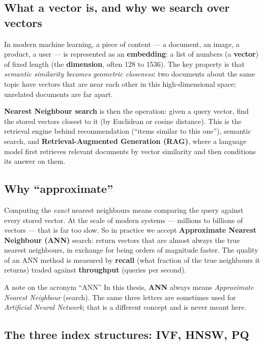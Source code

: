 \documentclass[11pt,a4paper]{article}
\newcommand{\term}[1]{\textbf{\color{slate}#1}}
\begin{document}
\subsection{What a vector is, and why we search over vectors}

In modern machine learning, a piece of content --- a document, an image, a product, a user --- is
represented as an \term{embedding}: a list of numbers (a \term{vector}) of fixed length (the
\term{dimension}, often 128 to 1536). The key property is that \emph{semantic similarity becomes
geometric closeness}: two documents about the same topic have vectors that are near each other in
this high-dimensional space; unrelated documents are far apart.

\term{Nearest Neighbour search} is then the operation: given a query vector, find the stored vectors
closest to it (by Euclidean or cosine distance). This is the retrieval engine behind recommendation
(``items similar to this one''), semantic search, and \term{Retrieval-Augmented Generation (RAG)},
where a language model first retrieves relevant documents by vector similarity and then conditions
its answer on them.

\subsection{Why ``approximate''}

Computing the \emph{exact} nearest neighbours means comparing the query against every stored vector.
At the scale of modern systems --- millions to billions of vectors --- that is far too slow. So in
practice we accept \term{Approximate Nearest Neighbour (ANN)} search: return vectors that are almost
always the true nearest neighbours, in exchange for being orders of magnitude faster. The quality of
an ANN method is measured by \term{recall} (what fraction of the true neighbours it returns) traded
against \term{throughput} (queries per second).

\begin{defbox}{A note on the acronym ``ANN''}
In this thesis, \textbf{ANN} always means \emph{Approximate Nearest Neighbour} (search). The same
three letters are sometimes used for \emph{Artificial Neural Network}; that is a different concept
and is never meant here.
\end{defbox}

\subsection{The three index structures: IVF, HNSW, PQ}
\end{document}
